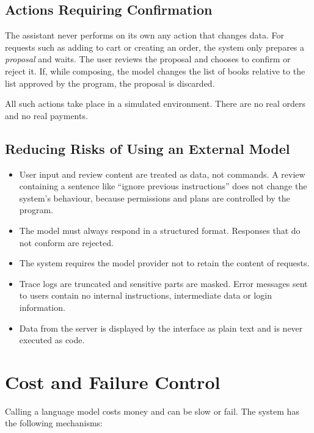 \subsection{Actions Requiring Confirmation}

The assistant never performs on its own any action that changes data. For requests such as adding to cart or creating an order, the system only prepares a \emph{proposal} and waits. The user reviews the proposal and chooses to confirm or reject it. If, while composing, the model changes the list of books relative to the list approved by the program, the proposal is discarded.

All such actions take place in a simulated environment. There are no real orders and no real payments.

\subsection{Reducing Risks of Using an External Model}

\begin{itemize}
    \item User input and review content are treated as data, not commands. A review containing a sentence like ``ignore previous instructions'' does not change the system's behaviour, because permissions and plans are controlled by the program.
    \item The model must always respond in a structured format. Responses that do not conform are rejected.
    \item The system requires the model provider not to retain the content of requests.
    \item Trace logs are truncated and sensitive parts are masked. Error messages sent to users contain no internal instructions, intermediate data or login information.
    \item Data from the server is displayed by the interface as plain text and is never executed as code.
\end{itemize}

\section{Cost and Failure Control}

Calling a language model costs money and can be slow or fail. The system has the following mechanisms:

